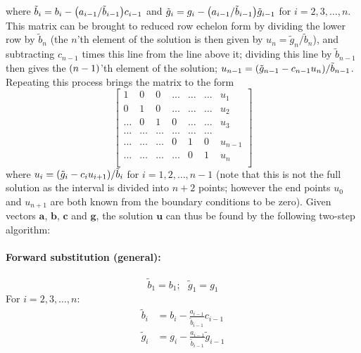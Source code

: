 \documentclass[a4paper,english]{article}
\renewcommand\vec{\mathbf}
\let\originalleft\left
\let\originalright\right
\renewcommand{\left}{\mathopen{}\mathclose\bgroup\originalleft}
\renewcommand{\right}{\aftergroup\egroup\originalright}
\begin{document}
where $\tilde{b}_i = b_i - \left(a_{i-1}/\tilde{b}_{i-1}\right)c_{i-1}$ and $\tilde{g}_i = g_i-\left(a_{i-1}/\tilde{b}_{i-1}\right)\tilde{g}_{i-1}$ for $i = 2,3,\dots,n$. This matrix can be brought to reduced row echelon form by dividing the lower row by $\tilde{b}_n$ (the $n$'th element of the solution is then given by $u_n = \tilde{g}_n/\tilde{b}_n$), and subtracting $c_{n-1}$ times this line from the line above it; dividing this line by $\tilde{b}_{n-1}$ then gives the $\left(n-1\right)$'th element of the solution; $u_{n-1} = \left(\tilde{g}_{n-1}-c_{n-1}u_n\right)/\tilde{b}_{n-1}$. Repeating this process brings the matrix to the form
\begin{equation}
  \begin{bmatrix}
    1 & 0 & 0 &\dots   & \dots &\dots & u_1\\
    0 & 1 & 0 &\dots &\dots &\dots & u_2\\
    \dots & 0 & 1 & 0 & \dots & \dots & u_3\\
    \dots & \dots   & \dots &\dots &\dots & \dots \\
    \dots & \dots & \dots & 0 &1& 0 & u_{n-1}\\
    \dots & \dots & \dots & \dots & 0 & 1 & u_n\\
  \end{bmatrix}
\end{equation}
where $u_i = \left(\tilde{g}_i-c_iu_{i+1}\right)/\tilde{b}_i$ for $i= 1,2,\dots,n-1$ (note that this is not the full solution as the interval is divided into $n+2$ points; however the end points $u_0$ and $u_{n+1}$ are both known from the boundary conditions to be zero). Given vectors $\vec{a}$, $\vec{b}$, $\vec{c}$ and $\vec{g}$, the solution $\vec{u}$ can thus be found by the following two-step algorithm:
\paragraph{Forward substitution (general):}
\begin{equation}
  \tilde{b}_1 = b_1;\text{ }\tilde{g}_1 = g_1
\end{equation}
For $i = 2,3,\dots,n$:
\begin{align}
  \tilde{b}_i &= b_i - \frac{a_{i-1}}{\tilde{b}_{i-1}}c_{i-1} \\
  \tilde{g}_i &= g_i-\frac{a_{i-1}}{\tilde{b}_{i-1}}\tilde{g}_{i-1}
\end{align}
\end{document}

